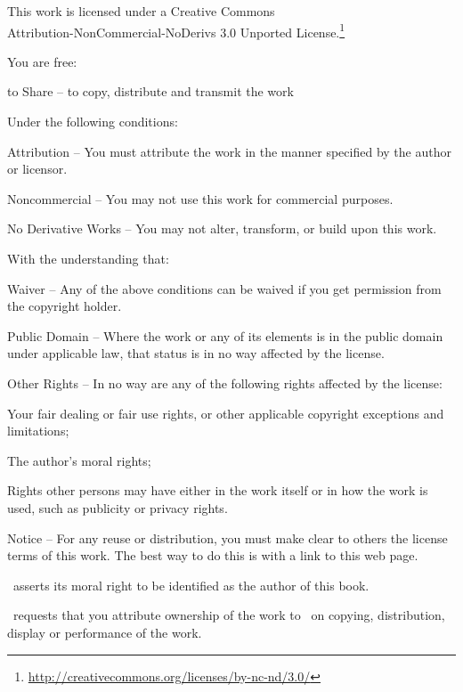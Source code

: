 \cleartorecto
{\smaller\setlength{\parindent}{0pt}%
\raggedright\label{copyright-details}
\setlength{\parskip}{7pt}
{\centering

{\LARGE\ccbyncnd}

This work is licensed under a Creative Commons\\
Attribution-NonCommercial-NoDerivs 3.0 Unported License.\footnote{%
\href{http://creativecommons.org/licenses/by-nc-nd/3.0/}{http://creativecommons.org/licenses/by-nc-nd/3.0/}}

}

You are free:
\begin{packeditemize}
  \item to Share -- to copy, distribute and transmit the work
\end{packeditemize}

Under the following conditions:

\begin{packeditemize}
\item Attribution -- You must attribute the work in the manner specified by the author or licensor.
\item Noncommercial -- You may not use this work for commercial purposes.
\item No Derivative Works -- You may not alter, transform, or build upon this work.
\end{packeditemize}

With the understanding that:

\begin{packeditemize}
    \item Waiver -- Any of the above conditions can be waived if you get permission from the copyright holder.
    \item Public Domain -- Where the work or any of its elements is in the public domain under applicable law, that status is in no way affected by the license.
    \item Other Rights -- In no way are any of the following rights affected by the license:
        \begin{packeditemize}
            \item Your fair dealing or fair use rights, or other applicable copyright exceptions and limitations;
            \item The author's moral rights;
            \item Rights other persons may have either in the work itself or in how the work is used, such as publicity or privacy rights.
        \end{packeditemize}
    \item Notice -- For any reuse or distribution, you must make clear to others the license terms of this work. The best way to do this is with a link to this web page.
\end{packeditemize}


\thePublisher\ asserts its moral right to be identified as the author of this book.

\thePublisher\ requests that you attribute ownership of the work to \thePublisher\ on copying, distribution, display or performance of the work.

}
